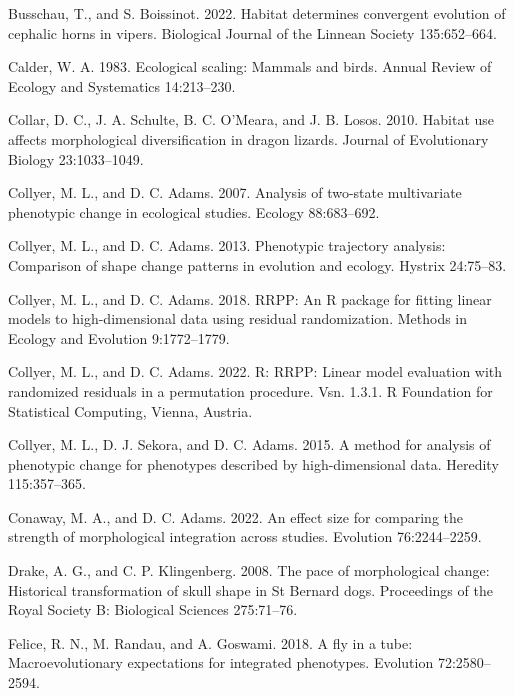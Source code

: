 \documentclass[
  11pt,
]{article}
\begin{document}
\leavevmode\hypertarget{ref-Busschau2022}{}%
Busschau, T., and S. Boissinot. 2022. Habitat determines convergent
evolution of cephalic horns in vipers. Biological Journal of the Linnean
Society 135:652--664.

\leavevmode\hypertarget{ref-Calder1983}{}%
Calder, W. A. 1983. Ecological scaling: Mammals and birds. Annual Review
of Ecology and Systematics 14:213--230.

\leavevmode\hypertarget{ref-COLLAR2010}{}%
Collar, D. C., J. A. Schulte, B. C. O'Meara, and J. B. Losos. 2010.
Habitat use affects morphological diversification in dragon lizards.
Journal of Evolutionary Biology 23:1033--1049.

\leavevmode\hypertarget{ref-CollyerAdams2007}{}%
Collyer, M. L., and D. C. Adams. 2007. Analysis of two-state
multivariate phenotypic change in ecological studies. Ecology
88:683--692.

\leavevmode\hypertarget{ref-CollyerAdams2013}{}%
Collyer, M. L., and D. C. Adams. 2013. Phenotypic trajectory analysis:
Comparison of shape change patterns in evolution and ecology. Hystrix
24:75--83.

\leavevmode\hypertarget{ref-CollyerAdams2018}{}%
Collyer, M. L., and D. C. Adams. 2018. RRPP: An R package for fitting
linear models to high-dimensional data using residual randomization.
Methods in Ecology and Evolution 9:1772--1779.

\leavevmode\hypertarget{ref-RRPP}{}%
Collyer, M. L., and D. C. Adams. 2022. R: RRPP: Linear model evaluation
with randomized residuals in a permutation procedure. Vsn. 1.3.1. R
Foundation for Statistical Computing, Vienna, Austria.

\leavevmode\hypertarget{ref-Collyer_et_al2015}{}%
Collyer, M. L., D. J. Sekora, and D. C. Adams. 2015. A method for
analysis of phenotypic change for phenotypes described by
high-dimensional data. Heredity 115:357--365.

\leavevmode\hypertarget{ref-ConawayAdams2022}{}%
Conaway, M. A., and D. C. Adams. 2022. An effect size for comparing the
strength of morphological integration across studies. Evolution
76:2244--2259.

\leavevmode\hypertarget{ref-DrakeKlingenberg2008}{}%
Drake, A. G., and C. P. Klingenberg. 2008. The pace of morphological
change: Historical transformation of skull shape in St Bernard dogs.
Proceedings of the Royal Society B: Biological Sciences 275:71--76.

\leavevmode\hypertarget{ref-Felice2018}{}%
Felice, R. N., M. Randau, and A. Goswami. 2018. A fly in a tube:
Macroevolutionary expectations for integrated phenotypes. Evolution
72:2580--2594.
\end{document}
